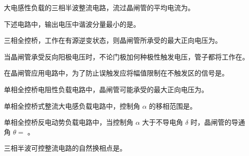 \documentclass[电力电子]{subfiles}
\begin{document}
\begin{ti}
	大电感性负载的三相半波整流电路，流过晶闸管的平均电流为。
\end{ti}

\begin{ti}
	下述电路中，输出电压中谐波分量最小的是。
\end{ti}

\begin{ti}
	三相全控桥，工作在有源逆变状态，则晶闸管所承受的最大正向电压为。
\end{ti}

\begin{ti}
	当晶闸管承受反向阳极电压时，不论门极加何种极性触发电压，管子都将工作在。
\end{ti}

\begin{ti}
	在晶闸管应用电路中，为了防止误触发应将幅值限制在不触发区的信号是。
\end{ti}

\begin{ti}
	单相全控桥电阻性负载电路中，晶闸管可能承受的最大正向电压为。
\end{ti}

\begin{ti}
	单相全控桥式整流大电感负载电路中，控制角 $\alpha$ 的移相范围是。
\end{ti}

\begin{ti}
	单相全控桥反电动势负载电路中，当控制角 $\alpha$ 大于不导电角 $\delta$ 时，晶闸管的导通角 $\theta = $ 。
	\fourch{$\uppi - \alpha$}{$\uppi + \alpha$}{$\uppi - \delta - \alpha$}{$\uppi + \delta - \alpha$}
\end{ti}

\begin{ti}
	三相半波可控整流电路的自然换相点是。
\end{ti}
\end{document}
